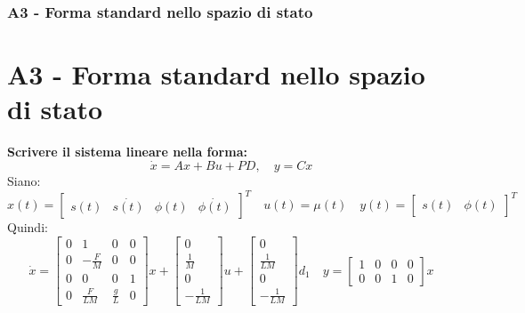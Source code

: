 \documentclass{beamer}
\begin{document}
\begin{frame}
	\frametitle{A3 - Forma standard nello spazio di stato}%
	\section{A3 - Forma standard nello spazio di stato}%
	\textbf{Scrivere il sistema lineare nella forma:\begin{equation*}
			\dot{x}=Ax+Bu+PD,\quad y=Cx
		\end{equation*}}
	\label{sec:A3}%
	Siano:\begin{equation*}
		x(t)=\begin{bmatrix}
			s(t) & \dot{s(t)} & \phi(t) & \dot{\phi(t)}
		\end{bmatrix}^{T}\quad u(t)=\mu(t)\quad y(t)=\begin{bmatrix}
			s(t) & \phi(t)
		\end{bmatrix}^{T}
	\end{equation*}
	Quindi:\small
	\begin{equation*}
		\dot{x}=\begin{bmatrix}
			0 & 1            & 0           & 0 \\
			0 & -\frac{F}{M} & 0           & 0 \\
			0 & 0            & 0           & 1 \\
			0 & \frac{F}{LM} & \frac{g}{L} & 0
		\end{bmatrix}x+\begin{bmatrix}
			0 \\\frac{1}{M}\\0\\-\frac{1}{LM}
		\end{bmatrix}u+\begin{bmatrix}
			0 \\\frac{1}{LM}\\0\\-\frac{1}{LM}
		\end{bmatrix}d_{1}\quad y=\begin{bmatrix}
			1 & 0 & 0 & 0 \\0&0&1&0
		\end{bmatrix}x
	\end{equation*}
\end{frame}
\end{document}
